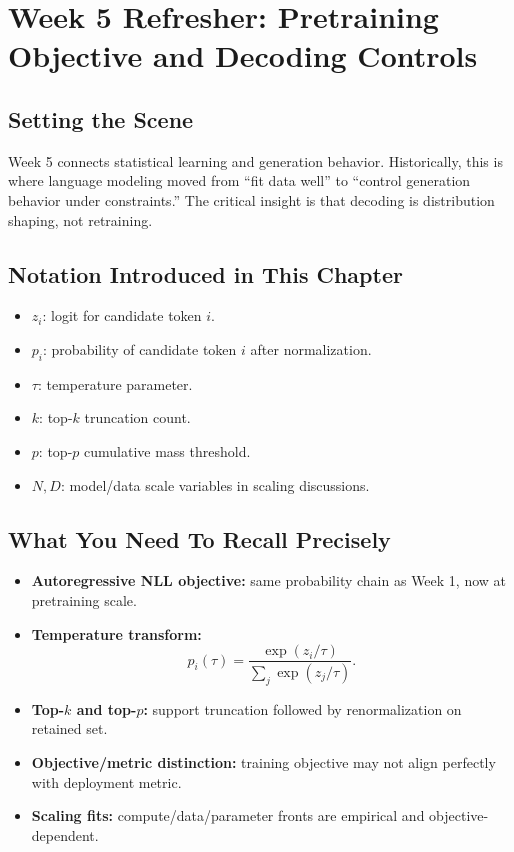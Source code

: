 \section{Week 5 Refresher: Pretraining Objective and Decoding Controls}

\subsection*{Setting the Scene}
Week 5 connects statistical learning and generation behavior. Historically, this is where language modeling moved from ``fit data well'' to ``control generation behavior under constraints.'' The critical insight is that decoding is distribution shaping, not retraining.

\subsection*{Notation Introduced in This Chapter}
\begin{itemize}[leftmargin=1.5em]
  \item $z_i$: logit for candidate token $i$.
  \item $p_i$: probability of candidate token $i$ after normalization.
  \item $\tau$: temperature parameter.
  \item $k$: top-$k$ truncation count.
  \item $p$: top-$p$ cumulative mass threshold.
  \item $N,D$: model/data scale variables in scaling discussions.
\end{itemize}

\subsection*{What You Need To Recall Precisely}
\begin{itemize}[leftmargin=1.5em]
  \item \textbf{Autoregressive NLL objective:} same probability chain as Week 1, now at pretraining scale.
  \item \textbf{Temperature transform:}
  \[
    p_i(\tau)=\frac{\exp(z_i/\tau)}{\sum_j \exp(z_j/\tau)}.
  \]
  \item \textbf{Top-$k$ and top-$p$:} support truncation followed by renormalization on retained set.
  \item \textbf{Objective/metric distinction:} training objective may not align perfectly with deployment metric.
  \item \textbf{Scaling fits:} compute/data/parameter fronts are empirical and objective-dependent.
\end{itemize}


